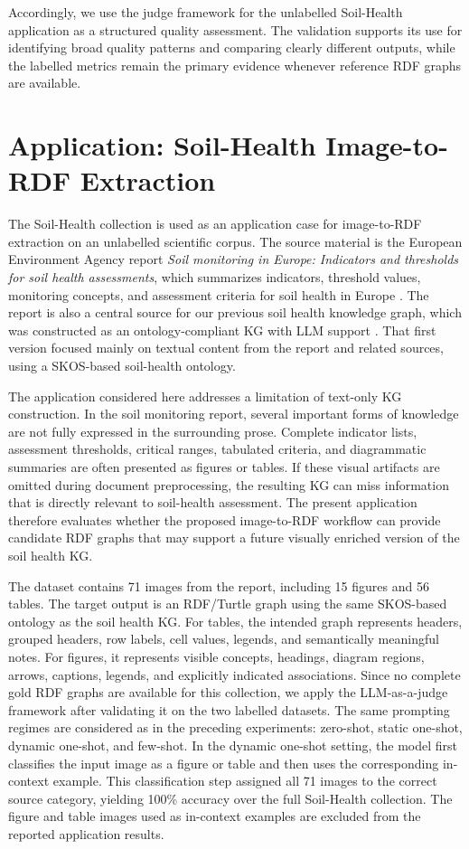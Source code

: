 \documentclass[preprint,12pt]{elsarticle}
\begin{document}
Accordingly, we use the judge framework for the unlabelled Soil-Health
application as a structured quality assessment. The validation supports its use for identifying broad quality patterns and comparing clearly different outputs, while the labelled metrics remain the primary evidence whenever reference RDF graphs are
available.


\section{Application: Soil-Health Image-to-RDF Extraction}\label{sec:soil_use_case}

The Soil-Health collection is used as an application case for image-to-RDF extraction on an unlabelled scientific corpus. The source material is the European Environment Agency report \textit{Soil monitoring in Europe: Indicators and thresholds for soil health assessments}, which summarizes indicators, threshold values, monitoring concepts, and assessment criteria for soil health in Europe \citep{eea2023soilmonitoring}. The report is also a central source for our previous soil health knowledge graph, which was constructed as an ontology-compliant KG with LLM support \citep{wang2025makesoilhealthy}. That first version focused mainly on textual content from the report and related sources, using a SKOS-based soil-health ontology.

The application considered here addresses a limitation of text-only KG construction. In the soil monitoring report, several important forms of knowledge are not fully expressed in the surrounding prose. Complete indicator lists, assessment thresholds, critical ranges, tabulated criteria, and diagrammatic summaries are often presented as figures or tables. If these visual artifacts are omitted during document preprocessing, the resulting KG can miss information that is directly relevant to soil-health assessment. The present application therefore evaluates whether the proposed image-to-RDF workflow can provide candidate RDF graphs that may support a future visually enriched version of the soil health KG.

The dataset contains 71 images from the report, including 15 figures and 56 tables. The target output is an RDF/Turtle graph using the same SKOS-based ontology as the soil health KG. For tables, the intended graph represents headers, grouped headers, row labels, cell values, legends, and semantically meaningful notes. For figures, it represents visible concepts, headings, diagram regions, arrows, captions, legends, and explicitly indicated associations. Since no complete gold RDF graphs are available for this collection, we apply the LLM-as-a-judge framework after validating it on the two labelled datasets. The same prompting regimes are considered as in the preceding experiments: zero-shot, static one-shot, dynamic one-shot, and few-shot. In the dynamic one-shot setting, the model first classifies the input image as a figure or table and then uses the corresponding in-context example. This classification step assigned all 71 images to the correct source category, yielding 100\% accuracy over the full Soil-Health collection. The figure and table images used as in-context examples are excluded from the reported application results.
\end{document}
